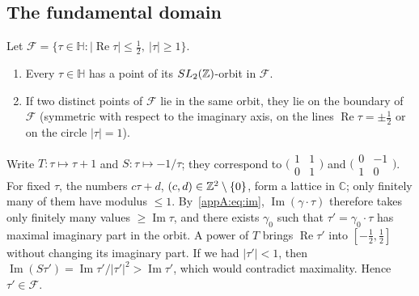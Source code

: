 \subsection{The fundamental domain}
\begin{theorem}\label{appA:thm:domaine}
Let $\mathcal F=\{\tau\in\mathbb H:|\operatorname{Re}\tau|\le\tfrac12,\ |\tau|\ge1\}$.
\begin{enumerate}
\item Every $\tau\in\mathbb H$ has a point of its $SL_2(\mathbb{Z})$-orbit in $\mathcal F$.
\item If two distinct points of $\mathcal F$ lie in the same orbit, they lie on the boundary of $\mathcal F$
(symmetric with respect to the imaginary axis, on the lines $\operatorname{Re}\tau=\pm\frac12$ or on the circle
$|\tau|=1$).
\end{enumerate}
\end{theorem}

\begin{humanproof}
Write $T:\tau\mapsto\tau+1$ and $S:\tau\mapsto-1/\tau$; they correspond to $\bigl(\begin{smallmatrix}1&1\\0&1\end{smallmatrix}\bigr)$
and $\bigl(\begin{smallmatrix}0&-1\\1&0\end{smallmatrix}\bigr)$. For fixed $\tau$, the numbers $c\tau+d$, $(c,d)\in\mathbb{Z}^2\setminus\{0\}$,
form a lattice in $\mathbb{C}$; only finitely many of them have modulus $\le1$. By~\eqref{appA:eq:im},
$\operatorname{Im}(\gamma\cdot\tau)$ therefore takes only finitely many values $\ge\operatorname{Im}\tau$, and there exists
$\gamma_0$ such that $\tau'=\gamma_0\cdot\tau$ has maximal imaginary part in the orbit. A power of $T$
brings $\operatorname{Re}\tau'$ into $[-\frac12,\frac12]$ without changing its imaginary part. If we had $|\tau'|<1$,
then $\operatorname{Im}(S\tau')=\operatorname{Im}\tau'/|\tau'|^2>\operatorname{Im}\tau'$, which would contradict
maximality. Hence $\tau'\in\mathcal F$.
\end{humanproof}


